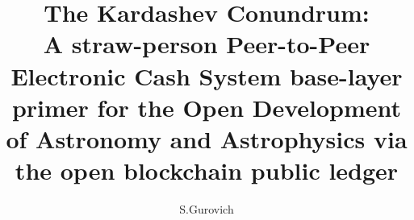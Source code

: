 \documentclass[final,5p,times,twocolumn,authoryear]{elsarticle}
\begin{document}
\begin{frontmatter}

\title{The Kardashev Conundrum:\\ A straw-person Peer-to-Peer Electronic Cash System base-layer primer for the Open Development of Astronomy and Astrophysics via the open blockchain public ledger}
 
    \author[iate,wsu]{S.Gurovich}
  
\address[iate]{
   Instituto De Astronom\'ia Te\'orica y Experimental -
   Observatorio Astron\'omico C\'ordoba (IATE--OAC--UNC--CONICET),
   Laprida 854, X5000BGR, C\'ordoba, Argentina}
\address[wsu]{
   Western Sydney University, Kingswood campus, NSW, Australia (visiting fellow 2019-2020)
}

\begin{abstract}


\end{abstract}
\end{frontmatter}
\end{document}

